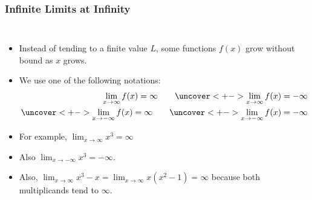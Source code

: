 \documentclass[serif,ignorenonframetext]{beamer}
\newcommand{\ds}{\displaystyle}
\begin{document}
\begin{frame}
  \frametitle{Infinite Limits at Infinity}
  \begin{columns}
  \begin{itemize}[<+->]
  \item Instead of tending to a finite value $L$, some
    functions $f(x)$ grow without bound as $x$ grows.
  \item We use one of the following notations:
    \begin{align*}
      \lim_{x\to\infty} f(x) = \infty
      \qquad
      \uncover<+->{\lim_{x\to\infty} f(x) = -\infty}%
      \\
      \uncover<+->{\lim_{x\to -\infty} f(x) = \infty}%
      \qquad
      \uncover<+->{\lim_{x\to -\infty} f(x) = -\infty}%
    \end{align*}
  \item For example, $\ds\lim_{x\to\infty} x^3 = \infty$
  \item Also $\ds\lim_{x\to -\infty} x^3 = -\infty$.
  \item Also, $\ds\lim_{x\to\infty} x^3-x = \lim_{x\to\infty} x(x^2-1)
    = \infty$ because both multiplicands tend to $\infty$.
  \end{itemize}

\end{columns}
\end{frame}
\end{document}
